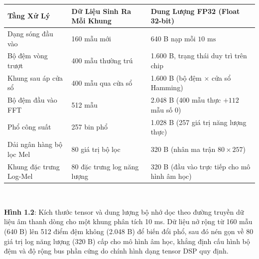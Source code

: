 \documentclass[11pt,a4paper]{article}
\renewcommand{\thefigure}{1.2\alph{figure}}
\begin{document}
\begin{center}\vspace{-1mm}
\begin{minipage}{\textwidth}
\centering
\small
{}\label{tab:tensor_sizes_vi}
\vspace{1mm}
\begin{tabular}{lll}
\toprule
\textbf{Tầng Xử Lý} & \textbf{Dữ Liệu Sinh Ra Mỗi Khung} & \textbf{Dung Lượng FP32 (Float 32-bit)} \\
\midrule
Dạng sóng đầu vào & 160 mẫu mới & 640 B nạp mỗi $10\text{ ms}$ \\
Bộ đệm vòng trượt & 400 mẫu thường trú & 1.600 B, trạng thái duy trì trên chip \\
Khung sau áp cửa sổ & 400 mẫu qua cửa sổ & 1.600 B (bộ đệm $\times$ cửa sổ Hamming) \\
Bộ đệm đầu vào FFT & 512 mẫu & 2.048 B (400 mẫu thực $+ 112$ mẫu số 0) \\
Phổ công suất & 257 bin phổ & 1.028 B (257 giá trị năng lượng thực) \\
Dải ngân hàng bộ lọc Mel & 80 giá trị bộ lọc & 320 B (nhân ma trận $80 \times 257$) \\
Khung đặc trưng Log-Mel & 80 đặc trưng log năng lượng & 320 B (đầu vào trực tiếp cho mô hình âm học) \\
\bottomrule
\end{tabular}
\end{minipage}
\end{center}

\begin{center}\vspace{-2mm}
\begin{minipage}{\textwidth}
\centering
\\[2mm]
\label{fig:1_2b_pipeline_tensor_sizes}
\begin{minipage}{0.95\textwidth}
\small\textbf{Hình \thefigure}: Kích thước tensor và dung lượng bộ nhớ dọc theo đường truyền dữ liệu âm thanh dòng cho một khung phân tích 10 ms. Dữ liệu nở rộng từ 160 mẫu (640 B) lên 512 điểm đệm không (2.048 B) để biến đổi phổ, sau đó nén gọn về 80 giá trị log năng lượng (320 B) cấp cho mô hình âm học, khẳng định cấu hình bộ đệm và độ rộng bus phần cứng do chính hình dạng tensor DSP quy định.
\end{minipage}
\end{minipage}\vspace{-2mm}
\end{center}
\clearpage
\end{document}
